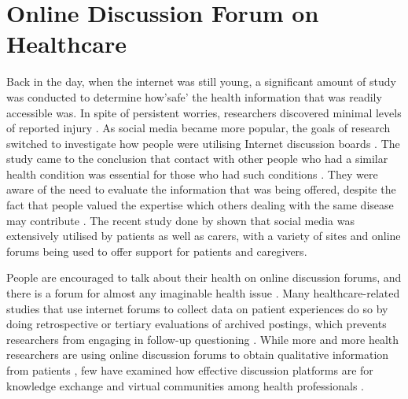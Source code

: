 \section{Online Discussion Forum on Healthcare}
Back in the day, when the internet was still young, a significant amount of study was conducted to determine how'safe' the health information that was readily accessible was. In spite of persistent worries, researchers discovered minimal levels of reported injury \citep{lit.fo1}. As social media became more popular, the goals of research switched to investigate how people were utilising Internet discussion boards \citep{lit.fo2}. The study came to the conclusion that contact with other people who had a similar health condition was essential for those who had such conditions \citep{lit.fo3}. They were aware of the need to evaluate the information that was being offered, despite the fact that people valued the expertise which others dealing with the same disease may contribute \citep{lit.fo4}. The recent study done by \cite{lit.fo5} shown that social media was extensively utilised by patients as well as carers, with a variety of sites and online forums being used to offer support for patients and caregivers.

People are encouraged to talk about their health on online discussion forums, and there is a forum for almost any imaginable health issue \citep{lit.fo6}. Many healthcare-related studies that use internet forums to collect data on patient experiences do so by doing retrospective or tertiary evaluations of archived postings, which prevents researchers from engaging in follow-up questioning \citep{lit.fo7, lit.fo8}. While more and more health researchers are using online discussion forums to obtain qualitative information from patients \citep{lit.fo9, lit.fo10}, few have examined how effective discussion platforms are for knowledge exchange and virtual communities among health professionals \citep{lit.fo12}.


\def\baselinestretch{1.66}
\medskip


